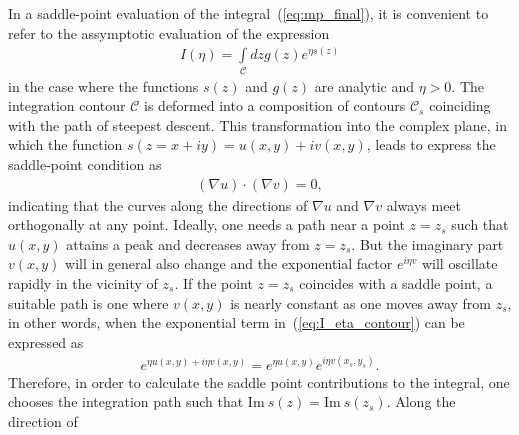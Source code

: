 In a saddle-point evaluation of the integral~(\ref{eq:mp_final}), it
is convenient to refer to the assymptotic evaluation of the expression
%
\begin{eqnarray}
  \label{eq:I_eta_contour}
  I(\eta) = \int\limits_{\mathcal{C}} dz g(z) e^{\eta s(z)}
\end{eqnarray}
%
in the case where the functions $s(z)$ and $g(z)$ are analytic and
$\eta > 0$. The integration contour $\mathcal{C}$ is deformed into a
composition of contours $\mathcal{C}_{s}$ coinciding with the path of
steepest descent. This transformation into the complex plane, in which
the function $s(z = x + iy) = u(x,y) + iv(x, y)$, leads to express the
saddle-point condition as
\begin{eqnarray}
  \label{eq:sp_uv_complex}
  (\nabla u) \cdot (\nabla v) = 0,
\end{eqnarray}
indicating that the curves along the directions of $\nabla u$ and
$\nabla v$ always meet orthogonally at any point. Ideally, one needs a
path near a point $z = z_{s}$ such that $u(x,y)$ attains a peak and
decreases away from $z = z_{s}$. But the imaginary part $v(x,y)$ will
in general also change and the exponential factor $e^{i\eta v}$ will
oscillate rapidly in the vicinity of $z_{s}$. If the point $z = z_{s}$
coincides with a saddle point, a suitable path is one where $v(x,y)$
is nearly constant as one moves away from $z_{s}$, in other words,
when the exponential term in~(\ref{eq:I_eta_contour}) can be expressed
as
%
\begin{eqnarray}
  \label{eq:exp_steepest}
  e^{\eta u(x,y) + i \eta v(x,y)} = e^{\eta u(x,y)} e^{i \eta v(x_{s},y_{s})}.
\end{eqnarray}
%
Therefore, in order to calculate the saddle point contributions to the
integral, one chooses the integration path such that
$\mathrm{Im}\ s(z) = \mathrm{Im}\ s(z_{s})$. Along the direction of
